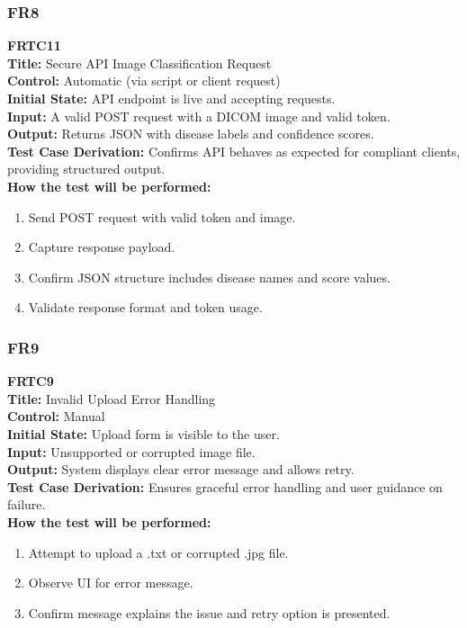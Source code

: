 \documentclass[12pt, titlepage]{article}
\begin{document}
\vspace{1em}
\subsubsection{FR8}
\textbf{FRTC11}\\
\textbf{Title:} Secure API Image Classification Request\\
\textbf{Control:} Automatic (via script or client request)\\
\textbf{Initial State:} API endpoint is live and accepting requests.\\
\textbf{Input:} A valid POST request with a DICOM image and valid token.\\
\textbf{Output:} Returns JSON with disease labels and confidence scores.\\
\textbf{Test Case Derivation:} Confirms API behaves as expected for compliant clients, providing structured output.\\
\textbf{How the test will be performed:}
\begin{enumerate}
  \item Send POST request with valid token and image.
  \item Capture response payload.
  \item Confirm JSON structure includes disease names and score values.
  \item Validate response format and token usage.
\end{enumerate}

\vspace{1em}
\subsubsection{FR9}
\textbf{FRTC9}\\
\textbf{Title:} Invalid Upload Error Handling\\
\textbf{Control:} Manual\\
\textbf{Initial State:} Upload form is visible to the user.\\
\textbf{Input:} Unsupported or corrupted image file.\\
\textbf{Output:} System displays clear error message and allows retry.\\
\textbf{Test Case Derivation:} Ensures graceful error handling and user guidance on failure.\\
\textbf{How the test will be performed:}
\begin{enumerate}
  \item Attempt to upload a .txt or corrupted .jpg file.
  \item Observe UI for error message.
  \item Confirm message explains the issue and retry option is presented.
\end{enumerate}
\end{document}
